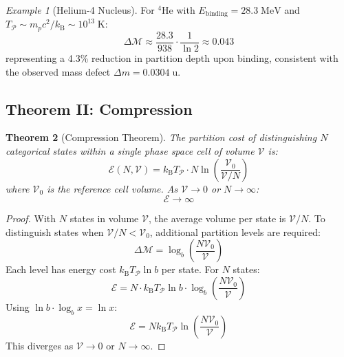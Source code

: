 \documentclass[twocolumn,10pt,a4paper]{article}
\theoremstyle{plain}
\newtheorem{theorem}{Theorem}[section]
\theoremstyle{definition}
\theoremstyle{remark}
\newtheorem{example}[theorem]{Example}
\newcommand{\kB}{k_{\mathrm{B}}}
\newcommand{\Depth}{\mathcal{M}}
\newcommand{\Cost}{\mathcal{E}}
\newcommand{\Partition}{\mathcal{P}}
\begin{document}
\begin{example}[Helium-4 Nucleus]
For $^4$He with $E_{\mathrm{binding}} = 28.3\;\mathrm{MeV}$ and $T_\Partition \sim m_p c^2/\kB \sim 10^{13}\;\mathrm{K}$:
\begin{equation}
    \Delta\Depth \approx \frac{28.3}{938} \cdot \frac{1}{\ln 2} \approx 0.043
\end{equation}
representing a 4.3\% reduction in partition depth upon binding, consistent with the observed mass defect $\Delta m = 0.0304\;\mathrm{u}$.
\end{example}

\subsection{Theorem II: Compression}

\begin{theorem}[Compression Theorem]
\label{thm:compression}
The partition cost of distinguishing $N$ categorical states within a single phase space cell of volume $\mathcal{V}$ is:
\begin{equation}
    \Cost(N, \mathcal{V}) = \kB T_\Partition \cdot N \ln\!\left(\frac{\mathcal{V}_0}{\mathcal{V}/N}\right)
\end{equation}
where $\mathcal{V}_0$ is the reference cell volume. As $\mathcal{V} \to 0$ or $N \to \infty$:
\begin{equation}
    \Cost \to \infty
\end{equation}
\end{theorem}

\begin{proof}
With $N$ states in volume $\mathcal{V}$, the average volume per state is $\mathcal{V}/N$. To distinguish states when $\mathcal{V}/N < \mathcal{V}_0$, additional partition levels are required:
\begin{equation}
    \Delta\Depth = \log_b\!\left(\frac{N\mathcal{V}_0}{\mathcal{V}}\right)
\end{equation}
Each level has energy cost $\kB T_\Partition \ln b$ per state. For $N$ states:
\begin{equation}
    \Cost = N \cdot \kB T_\Partition \ln b \cdot \log_b\!\left(\frac{N\mathcal{V}_0}{\mathcal{V}}\right)
\end{equation}
Using $\ln b \cdot \log_b x = \ln x$:
\begin{equation}
    \Cost = N \kB T_\Partition \ln\!\left(\frac{N\mathcal{V}_0}{\mathcal{V}}\right)
\end{equation}
This diverges as $\mathcal{V} \to 0$ or $N \to \infty$.
\end{proof}
\end{document}
